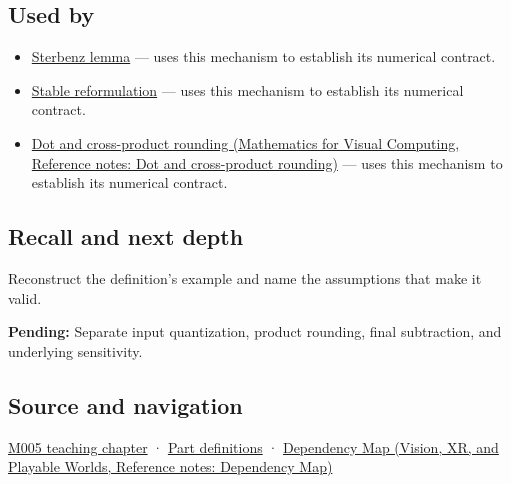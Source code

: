 \subsection{Used by}\label{appendix-a2773a6a2f9d-used-by}

\hypertarget{appendix-a2773a6a2f9d-used-by}{}

\begin{itemize}
\tightlist
\item
  \hyperref[appendix-399b7ad53f39]{Sterbenz lemma} --- uses this mechanism to establish its numerical contract.
\item
  \hyperref[appendix-d7f8ba961670]{Stable reformulation} --- uses this mechanism to establish its numerical contract.
\item
  \href{../02-Mathematics-for-Visual-Computing/main.pdf\#nameddest=appendix-5aef4f13483a}{Dot and cross-product rounding (Mathematics for Visual Computing, Reference notes: Dot and cross-product rounding)} --- uses this mechanism to establish its numerical contract.
\end{itemize}

\subsection{Recall and next depth}\label{appendix-a2773a6a2f9d-recall-and-next-depth}

\hypertarget{appendix-a2773a6a2f9d-recall-and-next-depth}{}

Reconstruct the definition's example and name the assumptions that make it valid.

\textbf{Pending:} Separate input quantization, product rounding, final subtraction, and underlying sensitivity.

\subsection{Source and navigation}\label{appendix-a2773a6a2f9d-source-and-navigation}

\hypertarget{appendix-a2773a6a2f9d-source-and-navigation}{}

\hyperref[01-foundations-i-ch001-when-arithmetic-meets-uncertainty]{M005 teaching chapter} · \hyperref[appendix-fd090d982a15-m005---parts-77-88]{Part definitions} · \href{../07-Vision-XR-and-Playable-Worlds/main.pdf\#nameddest=appendix-4ad47bdd269a}{Dependency Map (Vision, XR, and Playable Worlds, Reference notes: Dependency Map)}
